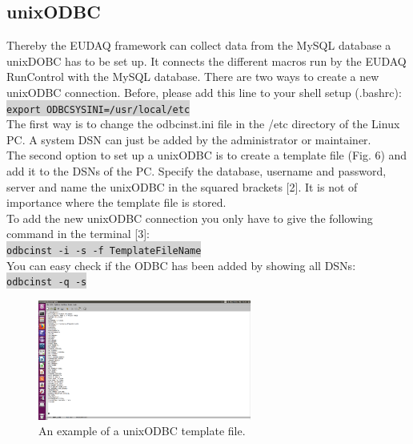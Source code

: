 \documentclass[a4paper,12pt]{scrartcl}
\begin{document}
\subsection{unixODBC}
Thereby the EUDAQ framework can collect data from the MySQL database a unixDOBC has to be set up. It connects the different macros run by the EUDAQ RunControl with the MySQL database. There are two ways to create a new unixODBC connection. Before, please add this line to your shell setup (.bashrc): \\
\colorbox{lightgray}{\texttt{export ODBCSYSINI=/usr/local/etc}} \\ The first way is to change the odbcinst.ini file in the /etc directory of the Linux PC. A system DSN can just be added by the administrator or maintainer. \\
The second option to set up a unixODBC is to create a template file (Fig. 6) and add it to the DSNs of the PC. Specify the database, username and password, server and name the unixODBC in the squared brackets [2]. It is not of importance where the template file is stored. \\
To add the new unixODBC connection you only have to give the following command in the terminal [3]: \\
\colorbox{lightgray}{\texttt{odbcinst -i -s -f TemplateFileName}}\\
You can easy check if the ODBC has been added by showing all DSNs:\\
\colorbox{lightgray}{\texttt{odbcinst -q -s}}\\


\begin{figure} [H]
\centering
\includegraphics[trim={2.5cm 5cm 50cm 3.5cm},clip,width=7cm]{unixtemplate.png}
\caption{An example of a unixODBC template file.}
\end{figure}
\end{document}
